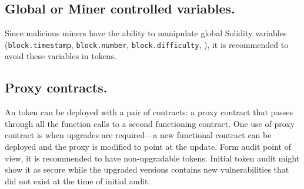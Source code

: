 \subsection{Global or Miner controlled variables.}

Since malicious miners have the ability to manipulate global Solidity variables (\eg \texttt{block.timestamp}, \linebreak\texttt{block.number}, \texttt{block.difficulty}, \etc), it is recommended to avoid these variables in \erc tokens.

\subsection{Proxy contracts.}

An \erc token can be deployed with a pair of contracts: a proxy contract that passes through all the function calls to a second functioning \erc contract\cite{ProxyContract,ProxyPatterns}. One use of proxy contract is when upgrades are required---a new functional contract can be deployed and the proxy is modified to point at the update. Form audit point of view, it is recommended to have non-upgradable \erc tokens. Initial token audit might show it as secure while the upgraded versions contains new vulnerabilities that did not exist at the time of initial audit.

